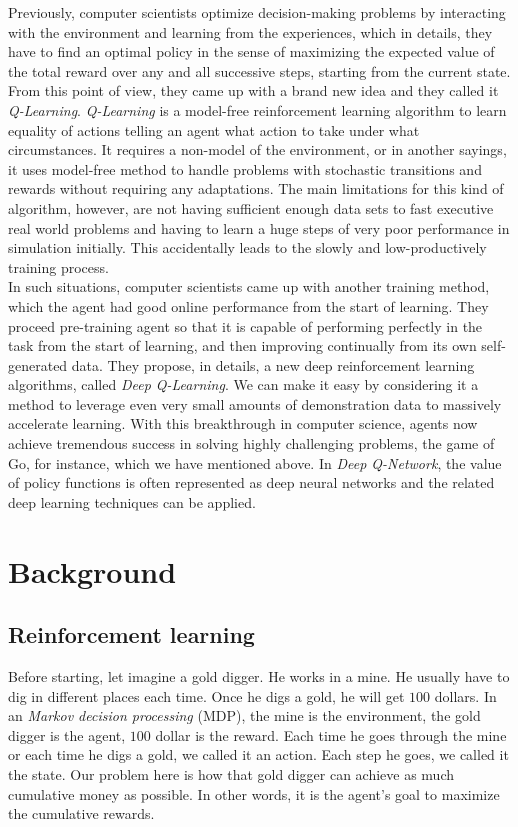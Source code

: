 \documentclass{article}
\begin{document}
\begin{flushleft} \justifying

Previously, computer scientists optimize decision-making problems by interacting with the environment and learning from the experiences, which in details, they have to find an optimal policy in the sense of maximizing the expected value of the total reward over any and all successive steps, starting from the current state. From this point of view, they came up with a brand new idea and they called it \textit{Q-Learning}. \textit{Q-Learning} is a model-free reinforcement learning algorithm to learn equality of actions telling an agent what action to take under what circumstances. It requires a non-model of the environment, or in another sayings, it uses model-free method to handle problems with stochastic transitions and rewards without requiring any adaptations. The main limitations for this kind of algorithm, however, are not having sufficient enough data sets to fast executive real world problems and having to learn a huge steps of very poor performance in simulation initially. This accidentally leads to the slowly and low-productively training process.\\ 

In such situations, computer scientists came up with another training method, which the agent had good online performance from the start of learning. They proceed pre-training agent so that it is capable of performing perfectly in the task from the start of learning, and then improving continually from its own self-generated data. They propose, in details, a new deep reinforcement learning algorithms, called \textit{Deep Q-Learning}. We can make it easy by considering it a method to leverage even very small amounts of demonstration data to massively accelerate learning. With this breakthrough in computer science, agents now achieve tremendous success in solving highly challenging problems, the game of Go, for instance, which we have mentioned above. In \textit{Deep Q-Network}, the value of policy functions is often represented as deep neural networks and the related deep learning techniques can be applied.

\end{flushleft}
\section{Background}
\subsection{Reinforcement learning}
Before starting, let imagine a gold digger. He works in a mine. He usually have to dig in different places each time. Once he digs a gold, he will get $100$ dollars. In an \textit{Markov decision processing} (MDP), the mine is the environment, the gold digger is the agent, $100$ dollar is the reward. Each time he goes through the mine or each time he digs a gold, we called it an action. Each step he goes, we called it the state. Our problem here is how that gold digger can achieve as much cumulative money as possible. In other words, it is the agent's goal to maximize the cumulative rewards.\\
\end{document}
